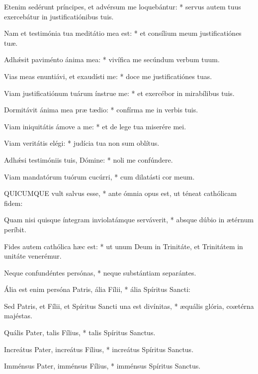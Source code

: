 Etenim sedérunt príncipes, et advérsum me loquebántur: * servus autem tuus exercebátur in justificatiónibus tuis.

Nam et testimónia tua meditátio mea est: * et consílium meum justificatiónes tuæ.

Adhǽsit paviménto ánima mea: * vivífica me secúndum verbum tuum.

Vias meas enuntiávi, et exaudísti me: * doce me justificatiónes tuas.

Viam justificatiónum tuárum ínstrue me: * et exercébor in mirabílibus tuis.

Dormitávit ánima mea præ tædio: * confírma me in verbis tuis.

Viam iniquitátis ámove a me: * et de lege tua miserére mei.

Viam veritátis elégi: * judícia tua non sum oblítus.

Adhǽsi testimóniis tuis, Dómine: * noli me confúndere.

Viam mandatórum tuórum cucúrri, * cum dilatásti cor meum.




QUICUMQUE vult salvus esse, * ante ómnia opus est, ut téneat cathólicam fidem:

Quam nisi quisque íntegram inviolatámque serváverit, * absque dúbio in ætérnum períbit.

Fides autem cathólica hæc est: * ut unum Deum in Trinitáte, et Trinitátem in unitáte venerémur.

Neque confundéntes persónas, * neque substántiam separántes.

Ália est enim persóna Patris, ália Fílii, * ália Spíritus Sancti:

Sed Patris, et Fílii, et Spíritus Sancti una est divínitas, * æquális glória, coætérna majéstas.

Quális Pater, talis Fílius, * talis Spíritus Sanctus.

Increátus Pater, increátus Fílius, * increátus Spíritus Sanctus.

Imménsus Pater, imménsus Fílius, * imménsus Spíritus Sanctus.

